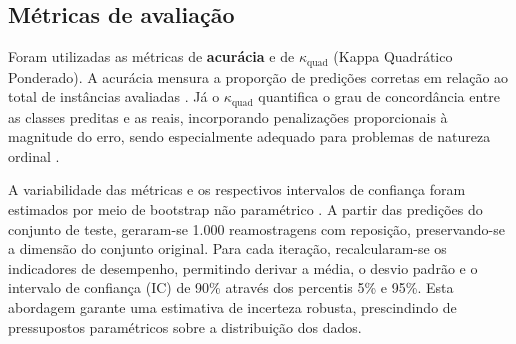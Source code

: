 \subsection{Métricas de avaliação}

Foram utilizadas as métricas de \textbf{acurácia} e de \textbf{$\kappa_{\text{quad}}$} (Kappa Quadrático Ponderado). A acurácia mensura a proporção de predições corretas em relação ao total de instâncias avaliadas \cite{baldi2000assessing}. Já o $\kappa_{\text{quad}}$ quantifica o grau de concordância entre as classes preditas e as reais, incorporando penalizações proporcionais à magnitude do erro, sendo especialmente adequado para problemas de natureza ordinal \cite{ref-cohen1968}. 

A variabilidade das métricas e os respectivos intervalos de confiança foram estimados por meio de bootstrap não paramétrico \cite{efron1979bootstrap}. A partir das predições do conjunto de teste, geraram-se 1.000 reamostragens com reposição, preservando-se a dimensão do conjunto original. Para cada iteração, recalcularam-se os indicadores de desempenho, permitindo derivar a média, o desvio padrão e o intervalo de confiança (IC) de 90\% através dos percentis 5\% e 95\%. Esta abordagem garante uma estimativa de incerteza robusta, prescindindo de pressupostos paramétricos sobre a distribuição dos dados.
